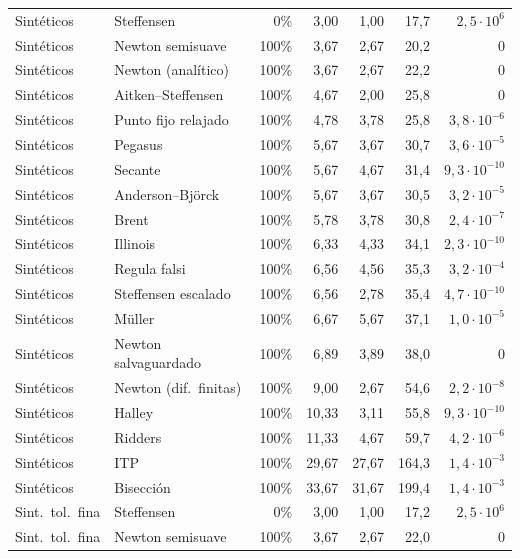 \begin{longtable}{@{}llrrrrr@{}}
\midrule
Sintéticos & Steffensen & 0\% & 3{,}00 & 1{,}00 & 17{,}7 & $2{,}5\cdot10^{6}$ \\
Sintéticos & Newton semisuave & 100\% & 3{,}67 & 2{,}67 & 20{,}2 & $0$ \\
Sintéticos & Newton (analítico) & 100\% & 3{,}67 & 2{,}67 & 22{,}2 & $0$ \\
Sintéticos & Aitken--Steffensen & 100\% & 4{,}67 & 2{,}00 & 25{,}8 & $0$ \\
Sintéticos & Punto fijo relajado & 100\% & 4{,}78 & 3{,}78 & 25{,}8 & $3{,}8\cdot10^{-6}$ \\
Sintéticos & Pegasus & 100\% & 5{,}67 & 3{,}67 & 30{,}7 & $3{,}6\cdot10^{-5}$ \\
Sintéticos & Secante & 100\% & 5{,}67 & 4{,}67 & 31{,}4 & $9{,}3\cdot10^{-10}$ \\
Sintéticos & Anderson--Björck & 100\% & 5{,}67 & 3{,}67 & 30{,}5 & $3{,}2\cdot10^{-5}$ \\
Sintéticos & Brent & 100\% & 5{,}78 & 3{,}78 & 30{,}8 & $2{,}4\cdot10^{-7}$ \\
Sintéticos & Illinois & 100\% & 6{,}33 & 4{,}33 & 34{,}1 & $2{,}3\cdot10^{-10}$ \\
Sintéticos & Regula falsi & 100\% & 6{,}56 & 4{,}56 & 35{,}3 & $3{,}2\cdot10^{-4}$ \\
Sintéticos & Steffensen escalado & 100\% & 6{,}56 & 2{,}78 & 35{,}4 & $4{,}7\cdot10^{-10}$ \\
Sintéticos & Müller & 100\% & 6{,}67 & 5{,}67 & 37{,}1 & $1{,}0\cdot10^{-5}$ \\
Sintéticos & Newton salvaguardado & 100\% & 6{,}89 & 3{,}89 & 38{,}0 & $0$ \\
Sintéticos & Newton (dif.\ finitas) & 100\% & 9{,}00 & 2{,}67 & 54{,}6 & $2{,}2\cdot10^{-8}$ \\
Sintéticos & Halley & 100\% & 10{,}33 & 3{,}11 & 55{,}8 & $9{,}3\cdot10^{-10}$ \\
Sintéticos & Ridders & 100\% & 11{,}33 & 4{,}67 & 59{,}7 & $4{,}2\cdot10^{-6}$ \\
Sintéticos & ITP & 100\% & 29{,}67 & 27{,}67 & 164{,}3 & $1{,}4\cdot10^{-3}$ \\
Sintéticos & Bisección & 100\% & 33{,}67 & 31{,}67 & 199{,}4 & $1{,}4\cdot10^{-3}$ \\
\midrule
Sint.\ tol.\ fina & Steffensen & 0\% & 3{,}00 & 1{,}00 & 17{,}2 & $2{,}5\cdot10^{6}$ \\
Sint.\ tol.\ fina & Newton semisuave & 100\% & 3{,}67 & 2{,}67 & 22{,}0 & $0$ \\

\end{longtable}
